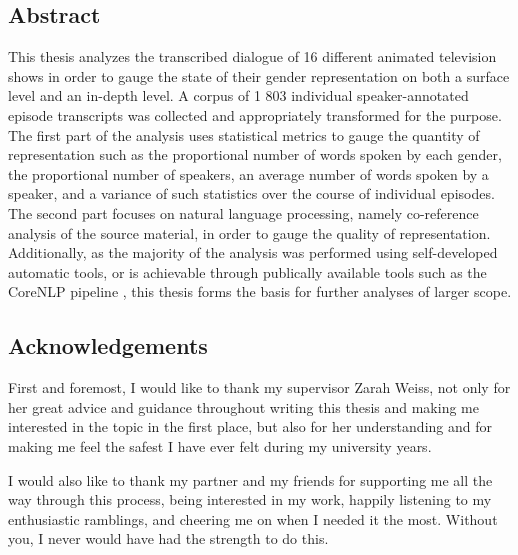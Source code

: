 \documentclass[a4paper, 11pt]{article}
\begin{document}

\newpage


\newpage
\begin{center}
\section*{Abstract}
\end{center}
This thesis analyzes the transcribed dialogue of 16 different animated television shows in order to gauge the state of their gender representation on both a surface level and an in-depth level. A corpus of 1 803 individual speaker-annotated episode transcripts was collected and appropriately transformed for the purpose. The first part of the analysis uses statistical metrics to gauge the quantity of representation such as the proportional number of words spoken by each gender, the proportional number of speakers, an average number of words spoken by a speaker, and a variance of such statistics over the course of individual episodes. The second part focuses on natural language processing, namely co-reference analysis of the source material, in order to gauge the quality of representation. Additionally, as the majority of the analysis was performed using self-developed automatic tools, or is achievable through publically available tools such as the CoreNLP pipeline \citep{manning-EtAl:2014:P14-5}, this thesis forms the basis for further analyses of larger scope.

\newpage
\begin{center}
\section*{Acknowledgements}
\end{center}
First and foremost, I would like to thank my supervisor Zarah Weiss, not only for her great advice and guidance throughout writing this thesis and making me interested in the topic in the first place, but also for her understanding and for making me feel the safest I have ever felt during my university years.

I would also like to thank my partner and my friends for supporting me all the way through this process, being interested in my work, happily listening to my enthusiastic ramblings, and cheering me on when I needed it the most. Without you, I never would have had the strength to do this.
\end{document}
